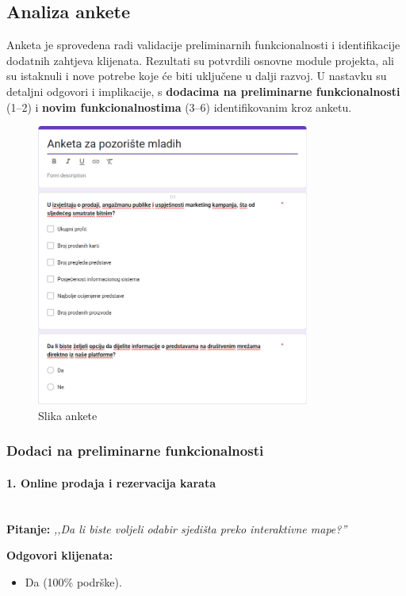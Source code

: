 \subsection{Analiza ankete}  
Anketa je sprovedena radi validacije preliminarnih funkcionalnosti i identifikacije dodatnih zahtjeva klijenata. Rezultati su potvrdili osnovne module projekta, ali su istaknuli i nove potrebe koje će biti uključene u dalji razvoj.  
U nastavku su detaljni odgovori i implikacije, s \textbf{dodacima na preliminarne funkcionalnosti} (1–2) i \textbf{novim funkcionalnostima} (3–6) identifikovanim kroz anketu.  

\begin{figure}[htbp]
  \centering 
  \includegraphics[width=0.8\textwidth]{Slike/Anketa.png} 
  \caption{Slika ankete} 
  \label{fig:anketa} 
\end{figure}

\subsubsection*{Dodaci na preliminarne funkcionalnosti}  

\paragraph*{1. Online prodaja i rezervacija karata}~\\
\textbf{Pitanje:}  
\emph{,,Da li biste voljeli odabir sjedišta preko interaktivne mape?''}  

\textbf{Odgovori klijenata:}  
\begin{itemize}  
    \item Da (100\% podrške).  
\end{itemize}  

